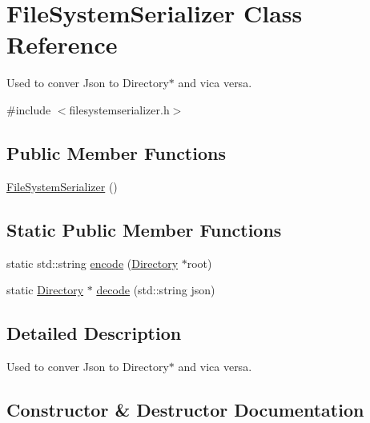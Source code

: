 \hypertarget{class_file_system_serializer}{}\section{File\+System\+Serializer Class Reference}
\label{class_file_system_serializer}


Used to conver Json to Directory$\ast$ and vica versa.  




{\ttfamily \#include $<$filesystemserializer.\+h$>$}

\subsection*{Public Member Functions}
\begin{DoxyCompactItemize}
\item 
\hyperlink{class_file_system_serializer_a2c4786d82ec0f26318ac869a7361ce50}{File\+System\+Serializer} ()
\end{DoxyCompactItemize}
\subsection*{Static Public Member Functions}
\begin{DoxyCompactItemize}
\item 
static std\+::string \hyperlink{class_file_system_serializer_aef096d9b5936bddd4beac3dc9181c28f}{encode} (\hyperlink{class_directory}{Directory} $\ast$root)
\item 
static \hyperlink{class_directory}{Directory} $\ast$ \hyperlink{class_file_system_serializer_a9a32306fcb9133696c1b5f795eaa1933}{decode} (std\+::string json)
\end{DoxyCompactItemize}


\subsection{Detailed Description}
Used to conver Json to Directory$\ast$ and vica versa. 

\subsection{Constructor \& Destructor Documentation}
\mbox{\label{class_file_system_serializer_a2c4786d82ec0f26318ac869a7361ce50}} 
